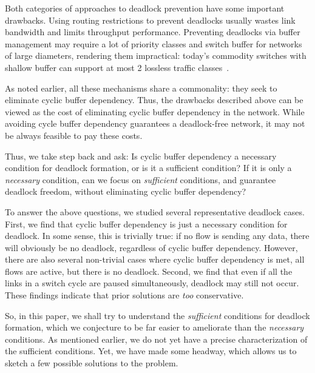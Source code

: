 Both categories of approaches to deadlock prevention have some important
drawbacks.  Using routing restrictions to prevent deadlocks usually wastes link
bandwidth and limits throughput performance. Preventing deadlocks via buffer
management may require a lot of priority classes and switch buffer for networks
of large diameters, rendering them impractical: today's commodity switches with
shallow buffer can support at most 2 lossless traffic classes~\cite{rdmascale}.

As noted earlier, all these mechanisms share a commonality: they seek to
eliminate cyclic buffer dependency.  Thus, the drawbacks described above can be
viewed as the cost of eliminating cyclic buffer dependency in the network. While
avoiding cycle buffer dependency guarantees a deadlock-free network, it may not
be always feasible to pay these costs.

Thus, we take step back and ask: Is cyclic buffer dependency a necessary
condition for deadlock formation, or is it a sufficient condition? If it is only
a {\em necessary} condition, can we focus on {\em sufficient} conditions, and
guarantee deadlock freedom, without  eliminating cyclic buffer dependency?

To answer the above questions, we studied several representative deadlock cases.
First, we find that cyclic buffer dependency is just a necessary condition for
deadlock. In some sense, this is trivially true: if no flow is sending any data,
there will obviously be no deadlock, regardless of cyclic buffer dependency.
However, there are also several non-trivial cases where cyclic buffer dependency
is met, all flows are active, but there is no deadlock.  Second, we find that
even if all the links in a switch cycle are paused simultaneously, deadlock may
still not occur.  These findings indicate that prior solutions are {\em too}
conservative.

So, in this paper, we shall try to understand the {\em sufficient} conditions
for deadlock formation, which we conjecture to be far easier to ameliorate than
the {\em necessary} conditions. As mentioned earlier, we do not yet have a
precise characterization of the sufficient conditions. Yet, we have made some
headway, which allows us to sketch a few possible solutions to the problem.

